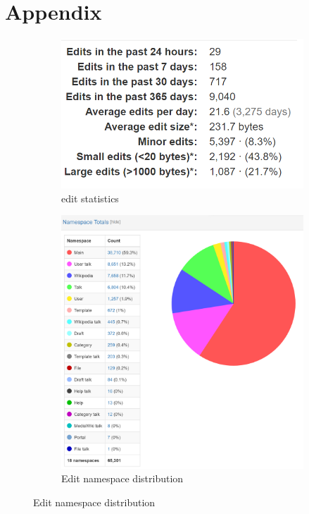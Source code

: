 \section{Appendix}

\begin{figure}[!ht]
    \centering
    \begin{subfigure}{0.49\textwidth}
        \centering
        \includegraphics[width=\textwidth]{images/editor_stats.PNG}
        \caption{edit statistics}
        \label{fig:edit-stats}
    \end{subfigure}
    \begin{subfigure}{0.49\textwidth}
        \centering
        \includegraphics[width=\textwidth]{images/editor_totals.PNG}
        \caption{Edit namespace distribution}
        \label{fig:namespace-totals}
    \end{subfigure}


\end{figure}
